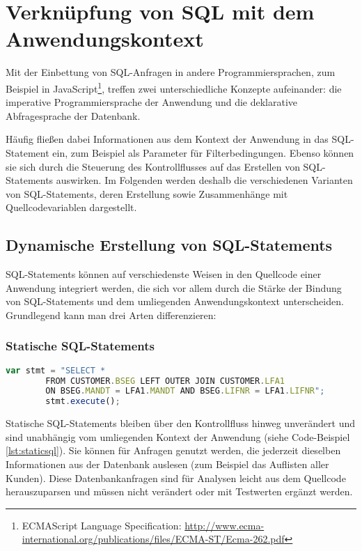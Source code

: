 \section{Verkn{\"u}pfung von SQL mit dem Anwendungskontext}\label{sec:dependencydetection}

%
%

Mit der Einbettung von SQL-Anfragen in andere Programmiersprachen, zum Beispiel in JavaScript\footnote{ECMAScript Language
Specification: \url{http://www.ecma-international.org/publications/files/ECMA-ST/Ecma-262.pdf}}, treffen zwei unterschiedliche Konzepte aufeinander: die imperative Programmiersprache der Anwendung und die deklarative Abfragesprache der Datenbank.

Häufig fließen dabei Informationen aus dem Kontext der Anwendung in das SQL-Statement ein, zum Beispiel als Parameter für Filterbedingungen.
Ebenso können sie sich durch die Steuerung des Kontrollflusses auf das Erstellen von SQL-Statements auswirken.
Im Folgenden werden deshalb die verschiedenen Varianten von SQL-Statements, deren Erstellung sowie Zusammenhänge mit Quellcodevariablen dargestellt.

\subsection{Dynamische Erstellung von SQL-Statements}
SQL-Statements können auf verschiedenste Weisen in den Quellcode einer Anwendung integriert werden, die sich vor allem durch die Stärke der Bindung von SQL-Statements und dem umliegenden Anwendungskontext unterscheiden.
Grundlegend kann man drei Arten differenzieren:

\subsubsection{Statische SQL-Statements}

	\begin{lstlisting}[caption={Statisches SQL-Statement eingebettet im Quellcode}, label={lst:staticsql}, language=JavaScript]
		var stmt = "SELECT *
		FROM CUSTOMER.BSEG LEFT OUTER JOIN CUSTOMER.LFA1
		ON BSEG.MANDT = LFA1.MANDT AND BSEG.LIFNR = LFA1.LIFNR";
		stmt.execute();
	\end{lstlisting}

Statische SQL-Statements bleiben über den Kontrollfluss hinweg unverändert und sind unabhängig vom umliegenden Kontext der Anwendung (siehe Code-Beispiel \ref{lst:staticsql}).
Sie können für Anfragen genutzt werden, die jederzeit dieselben Informationen aus der Datenbank auslesen (zum Beispiel das Auflisten aller Kunden).
Diese Datenbankanfragen sind für Analysen leicht aus dem Quellcode herauszuparsen und müssen nicht verändert oder mit Testwerten ergänzt werden.

